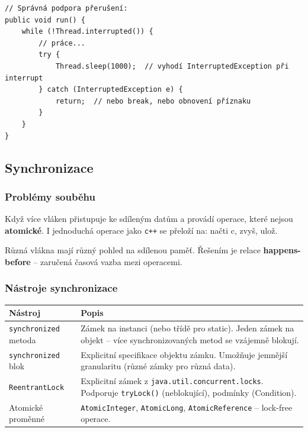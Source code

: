 \documentclass[11pt,a4paper]{article}
\begin{document}
\begin{verbatim}
// Správná podpora přerušení:
public void run() {
    while (!Thread.interrupted()) {
        // práce...
        try {
            Thread.sleep(1000);  // vyhodí InterruptedException při interrupt
        } catch (InterruptedException e) {
            return;  // nebo break, nebo obnovení příznaku
        }
    }
}
\end{verbatim}

\subsection{Synchronizace}

\subsubsection{Problémy souběhu}

\begin{tcolorbox}[defbox,title=Thread Interference]
Když více vláken přistupuje ke sdíleným datům a provádí operace, které nejsou \textbf{atomické}. I jednoduchá operace jako \texttt{c++} se přeloží na: načti c, zvyš, ulož.
\end{tcolorbox}

\begin{tcolorbox}[defbox,title=Memory Consistency Errors]
Různá vlákna mají různý pohled na sdílenou paměť. Řešením je relace \textbf{happens-before} -- zaručená časová vazba mezi operacemi.
\end{tcolorbox}

\subsubsection{Nástroje synchronizace}

\begin{center}
\begin{tabular}{>{\raggedright}p{3.5cm} >{\raggedright\arraybackslash}p{9.5cm}}
\toprule
\textbf{Nástroj} & \textbf{Popis} \\
\midrule
\texttt{synchronized} metoda & Zámek na instanci (nebo třídě pro static). Jeden zámek na objekt -- více synchronizovaných metod se vzájemně blokují. \\
\addlinespace
\texttt{synchronized} blok & Explicitní specifikace objektu zámku. Umožňuje jemnější granularitu (různé zámky pro různá data). \\
\addlinespace
\texttt{ReentrantLock} & Explicitní zámek z \texttt{java.util.concurrent.locks}. Podporuje \texttt{tryLock()} (neblokující), podmínky (Condition). \\
\addlinespace
Atomické proměnné & \texttt{AtomicInteger}, \texttt{AtomicLong}, \texttt{AtomicReference} -- lock-free operace. \\
\bottomrule
\end{tabular}
\end{center}
\end{document}
